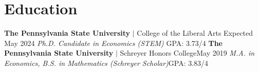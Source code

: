 \section{Education}
  \resumeSubHeadingListStart
  \resumeSubSubheading
  {\textbf{The Pennsylvania State University} $|$ College of the Liberal Arts }{Expected May 2024}
  \resumeSubSubheading
  {\emph{Ph.D. Candidate in Economics (STEM)} }{GPA: 3.73/4}
      \resumeItemListStart
      \resumeItemListEnd
      \resumeSubSubheading
  {\textbf{The Pennsylvania State University} $|$ Schreyer Honors College}{May 2019}
  \resumeSubSubheading
  {\emph{M.A. in Economics, B.S. in Mathematics (Schreyer Scholar)}}{GPA: 3.83/4}
    \resumeSubHeadingListEnd